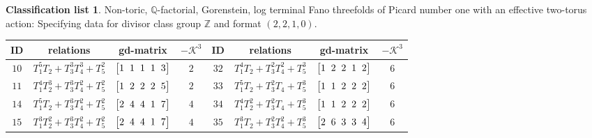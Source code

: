 \documentclass[10pt,a4paper]{amsart}
\theoremstyle{definition}
\newtheorem{class-list}[thm]{Classification list}
\def\ZZ{{\mathbb Z}}
\def\QQ{{\mathbb Q}}
\numberwithin{equation}{section}
\begin{document}

\begin{class-list}\label{class-list(0)}
Non-toric, $\QQ$-factorial, Gorenstein, log terminal Fano
threefolds of Picard number one with an effective two-torus action:
Specifying data for divisor class group $\ZZ$ and format $(2,2,1,0)$.
\begin{table}[h!]\centering\setlength{\tabcolsep}{3.5pt}
\renewcommand{\arraystretch}{1.3}\small\tabulinesep=1mm
\begin{tabu}{c|c|c|c||c|c|c|c}
\hline
ID&relations&gd-matrix&$-\mathcal{K}^3$&ID&relations&gd-matrix&$-\mathcal{K}^3$
\\
\hline
$10$&$T_{1}^{5}T_{2}+T_{3}^{3}T_{4}^{3}+T_{5}^{2}$
&$\arraycolsep=1mm\begin{bmatrix}1&1&1&1&3\end{bmatrix}$&${2}$
&${32}$&${T_{1}^{4}T_{2}+T_{3}^{2}T_{4}^{2}+T_{5}^{3}}$
&$\arraycolsep=1mm\begin{bmatrix}{1} & {2} & {2} & {1} & {2}\end{bmatrix}$&${6}$
\\
\hline
${11}$&${T_{1}^{4}T_{2}^{3}+T_{3}^{3}T_{4}^{2}+T_{5}^{2}}$
&$\arraycolsep=1mm\begin{bmatrix}{1} & {2} & {2} & {2} & {5}\end{bmatrix}$&${2}$
&${33}$&${T_{1}^{5}T_{2}+T_{3}^{2}T_{4}+T_{5}^{3}}$
&$\arraycolsep=1mm\begin{bmatrix}{1} & {1} & {2} & {2} & {2}\end{bmatrix}$&${6}$
\\
\hline
${14}$&${T_{1}^{5}T_{2}+T_{3}^{3}T_{4}^{2}+T_{5}^{2}}$
&$\arraycolsep=1mm\begin{bmatrix}{2} & {4} & {4} & {1} & {7}\end{bmatrix}$&${4}$
&${34}$&${T_{1}^{4}T_{2}^{2}+T_{3}^{2}T_{4}+T_{5}^{3}}$
&$\arraycolsep=1mm\begin{bmatrix}{1} & {1} & {2} & {2} & {2}\end{bmatrix}$&${6}$
\\
\hline
${15}$&${T_{1}^{3}T_{2}^{2}+T_{3}^{3}T_{4}^{2}+T_{5}^{2}}$
&$\arraycolsep=1mm\begin{bmatrix}{2} & {4} & {4} & {1} & {7}\end{bmatrix}$&${4}$
&${35}$&${T_{1}^{3}T_{2}+T_{3}^{2}T_{4}^{2}+T_{5}^{3}}$
&$\arraycolsep=1mm\begin{bmatrix}{2} & {6} & {3} & {3} & {4}\end{bmatrix}$&${6}$
\\
\hline

\end{tabu}
\end{table}
\end{class-list}
\end{document}
